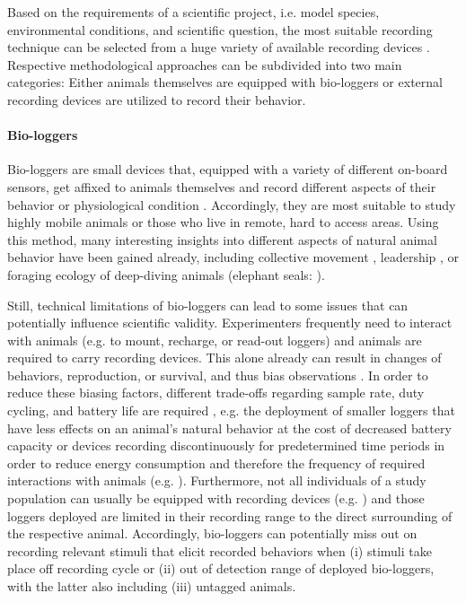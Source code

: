 Based on the requirements of a scientific project, i.e. model species, environmental conditions, and scientific question, the most suitable recording technique can be selected from a huge variety of available recording devices \citep{Hughey2018}. Respective methodological approaches can be subdivided into two main categories: Either animals themselves are equipped with bio-loggers or external recording devices are utilized to record their behavior.

\paragraph{Bio-loggers} 

Bio-loggers are small devices that, equipped with a variety of different on-board sensors, get affixed to animals themselves and record different aspects of their behavior or physiological condition \citep{Menzel2005, Baktoft2015, Strandburg2015}. Accordingly, they are most suitable to study highly mobile animals or those who live in remote, hard to access areas. Using this method, many interesting insights into different aspects of natural animal behavior have been gained already, including collective movement \citep{Nagy2010, Strandburg2015}, leadership \citep{Strandburg2018}, or foraging ecology of deep-diving animals (elephant seals: \citealp{Robinson2012}). 

Still, technical limitations of bio-loggers can lead to some issues that can potentially influence scientific validity. Experimenters frequently need to interact with animals (e.g. to mount, recharge, or read-out loggers) and animals are required to carry recording devices. This alone already can result in changes of behaviors, reproduction, or survival, and thus bias observations \citep{Saraux2011}. In order to reduce these biasing factors, different trade-offs regarding sample rate, duty cycling, and battery life are required \citep{Hughey2018}, e.g. the deployment of smaller loggers that have less effects on an animal's natural behavior at the cost of decreased battery capacity or devices recording discontinuously for predetermined time periods in order to reduce energy consumption and therefore the frequency of required interactions with animals (e.g. \citealp{StrandburgPeshkin2017}). Furthermore, not all individuals of a study population can usually be equipped with recording devices (e.g. \citealp{StrandburgPeshkin2019}) and those loggers deployed are limited in their recording range to the direct surrounding of the respective animal. Accordingly, bio-loggers can potentially miss out on recording relevant stimuli that elicit recorded behaviors when (i) stimuli take place off recording cycle or (ii) out of detection range of deployed bio-loggers, with the latter also including (iii) untagged animals. 

